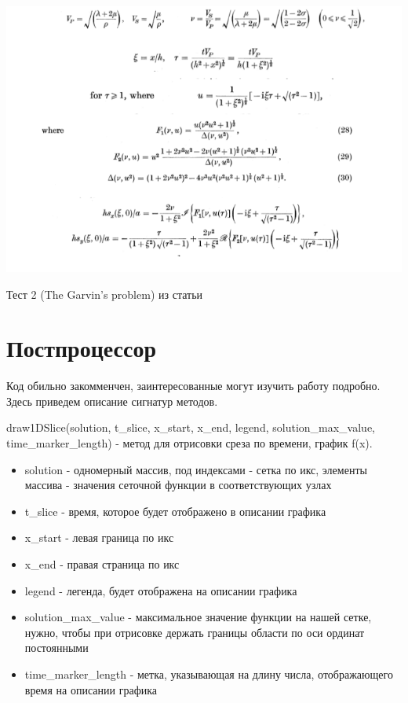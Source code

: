 \documentclass{article}
\begin{document}
\includegraphics[scale=0.5]{2D_seismic_tests/8.png}

Тест 2 (The Garvin’s problem) из статьи \cite{free_and_smooth}


\newpage
\section{Постпроцессор}
\indent 
Код обильно закомменчен, заинтересованные могут изучить работу подробно. Здесь приведем описание сигнатур методов.

\noindent 
draw1DSlice(solution, t\_slice, x\_start, x\_end, legend, solution\_max\_value, time\_marker\_length) - метод для отрисовки среза по времени, график f(x).
\begin{itemize}
\item solution - одномерный массив, под индексами - сетка по икс, элементы массива - значения сеточной функции в соответствующих узлах
\item t\_slice - время, которое будет отображено в описании графика
\item x\_start - левая граница по икс
\item x\_end - правая страница по икс
\item legend - легенда, будет отображена на описании графика
\item solution\_max\_value - максимальное значение функции на нашей сетке, нужно, чтобы при отрисовке держать границы области по оси ординат постоянными
\item time\_marker\_length - метка, указывающая на длину числа, отображающего время на описании графика
\end{itemize}
\end{document}
